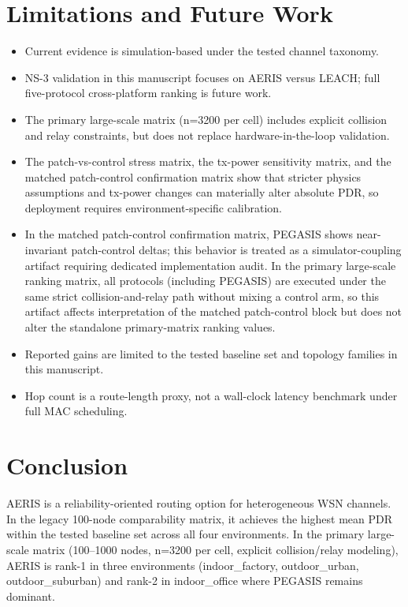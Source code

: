 ﻿\documentclass[sensors,article,submit,moreauthors,pdftex]{Definitions/mdpi}
\begin{document}
\section{Limitations and Future Work}
\begin{itemize}
\item Current evidence is simulation-based under the tested channel taxonomy.
\item NS-3 validation in this manuscript focuses on AERIS versus LEACH; full five-protocol cross-platform ranking is future work.
\item The primary large-scale matrix (n=3200 per cell) includes explicit collision and relay constraints, but does not replace hardware-in-the-loop validation.
\item The patch-vs-control stress matrix, the tx-power sensitivity matrix, and the matched patch-control confirmation matrix show that stricter physics assumptions and tx-power changes can materially alter absolute PDR, so deployment requires environment-specific calibration.
\item In the matched patch-control confirmation matrix, PEGASIS shows near-invariant patch-control deltas; this behavior is treated as a simulator-coupling artifact requiring dedicated implementation audit. In the primary large-scale ranking matrix, all protocols (including PEGASIS) are executed under the same strict collision-and-relay path without mixing a control arm, so this artifact affects interpretation of the matched patch-control block but does not alter the standalone primary-matrix ranking values.
\item Reported gains are limited to the tested baseline set and topology families in this manuscript.
\item Hop count is a route-length proxy, not a wall-clock latency benchmark under full MAC scheduling.
\end{itemize}

\section{Conclusion}
AERIS is a reliability-oriented routing option for heterogeneous WSN channels. In the legacy 100-node comparability matrix, it achieves the highest mean PDR within the tested baseline set across all four environments. In the primary large-scale matrix (100--1000 nodes, n=3200 per cell, explicit collision/relay modeling), AERIS is rank-1 in three environments (indoor\_factory, outdoor\_urban, outdoor\_suburban) and rank-2 in indoor\_office where PEGASIS remains dominant.
\end{document}
